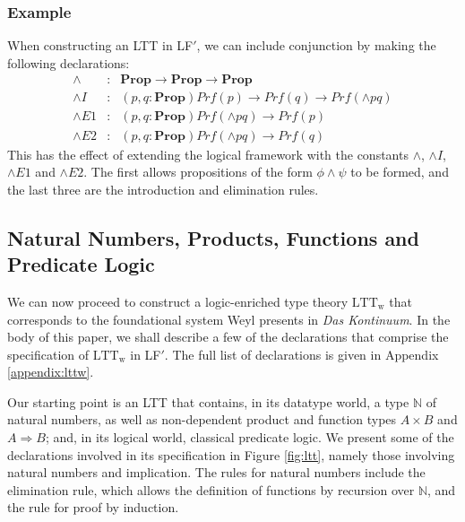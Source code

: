 \documentclass[acmtocl]{acmtrans2m}
\newcommand{\LTTW}{\ensuremath{\mathrm{LTT}_\mathrm{w}}}
\newcommand{\Prop}{\mathbf{Prop}}
\newcommand{\Prf}[1]{Prf \left( {#1} \right)}
\newcommand{\LF}{LF$'$}
\newcommand{\boldarrow}{\Rightarrow}
\begin{document}
\subsubsection{Example}
When constructing an LTT in \LF,
we can include conjunction by making the following declarations:
\begin{eqnarray*}
 \wedge & : & \Prop \rightarrow \Prop \rightarrow \Prop \\
\wedge I & : & (p,q : \Prop) \Prf{p} \rightarrow \Prf{q} \rightarrow \Prf{\wedge p q} \\
\wedge E1 & : & (p,q : \Prop) \Prf{\wedge p q} \rightarrow \Prf{p} \\
\wedge E2 & : & (p,q : \Prop) \Prf{\wedge p q} \rightarrow \Prf{q}
\end{eqnarray*}
This has the effect of extending the logical framework with the
constants $\wedge$, $\wedge I$, $\wedge E1$ and $\wedge E2$.
The first allows propositions of the form $\phi \wedge \psi$ to be formed,
and the last three are the introduction and elimination rules.





\subsection{Natural Numbers, Products, Functions and Predicate Logic}

We can now proceed to construct a logic-enriched type theory $\LTTW$ that
corresponds to the foundational system Weyl presents in \emph{Das
Kontinuum}.
In the body of this paper, we shall describe a few of the declarations that comprise the specification of $\LTTW$ in \LF.  The full list of declarations is given in Appendix \ref{appendix:lttw}.

Our starting point is an LTT that contains, in its datatype
world, a type $\mathbb{N}$ of natural numbers, as well as
non-dependent product and function types $A \times B$ and $A
\boldarrow B$; and, in its logical world, classical predicate
logic.  We present some of the declarations involved in its
specification in Figure \ref{fig:ltt}, namely those involving
natural numbers and implication.  The rules for natural numbers include the elimination rule, which allows the definition of functions by recursion over $\mathbb{N}$, and the rule for proof by induction.
\end{document}
